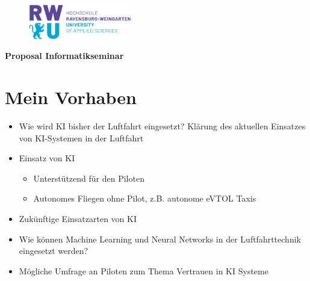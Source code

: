 \documentclass[12pt,a4paper]{article}
\begin{document}
	
	\renewcommand{\familydefault}{\sfdefault}
	\normalfont
	\onehalfspacing
	
	\vspace*{-2.5cm} 
	\begin{figure}[H]%
		\raggedleft \includegraphics[height=1.5cm]{figures/RWU_Logo.png}
		\hfill %
		\end{figure}
	
	{\LARGE\textbf{Proposal Informatikseminar}}\\
	\section{Mein Vorhaben}
	\begin{itemize}
		\item{Wie wird KI bisher der Luftfahrt eingesetzt? Klärung des aktuellen Einsatzes von KI-Systemen in der Luftfahrt}
		\item{Einsatz von KI}
			\begin{itemize}
				\item{Unterstützend für den Piloten}
				\item{Autonomes Fliegen ohne Pilot, z.B. autonome eVTOL Taxis}
			\end{itemize}
		\item {Zukünftige Einsatzarten von KI}
		\item{Wie können Machine Learning und Neural Networks in der Luftfahrttechnik eingesetzt werden?}
		\item{Mögliche Umfrage an Piloten zum Thema Vertrauen in KI Systeme}
		
	\end{itemize}
\end{document}
